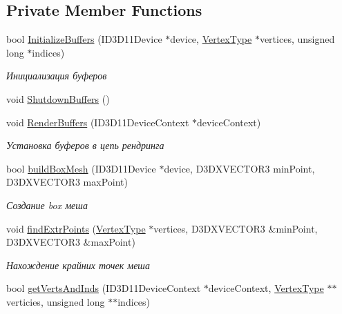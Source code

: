 \subsection*{Private Member Functions}
\begin{DoxyCompactItemize}
\item 
bool \hyperlink{class_mesh_class_a0a11d7bc06ff88f194b33229ce19ca62}{Initialize\+Buffers} (I\+D3\+D11\+Device $\ast$device, \hyperlink{struct_mesh_class_1_1_vertex_type}{Vertex\+Type} $\ast$vertices, unsigned long $\ast$indices)
\begin{DoxyCompactList}\small\item\em Инициализация буферов \end{DoxyCompactList}\item 
void \hyperlink{class_mesh_class_a6df03981f5d387453ea016abd6c185f4}{Shutdown\+Buffers} ()
\item 
void \hyperlink{class_mesh_class_a98e3d97acabf6b48d17152af2efb214c}{Render\+Buffers} (I\+D3\+D11\+Device\+Context $\ast$device\+Context)
\begin{DoxyCompactList}\small\item\em Установка буферов в цепь рендринга \end{DoxyCompactList}\item 
bool \hyperlink{class_mesh_class_a631e96de86a30d8773f46016d4bf0882}{build\+Box\+Mesh} (I\+D3\+D11\+Device $\ast$device, D3\+D\+X\+V\+E\+C\+T\+O\+R3 min\+Point, D3\+D\+X\+V\+E\+C\+T\+O\+R3 max\+Point)
\begin{DoxyCompactList}\small\item\em Создание box меша \end{DoxyCompactList}\item 
void \hyperlink{class_mesh_class_af0ed8e886d7c25ee730c067ad7ddbe4f}{find\+Extr\+Points} (\hyperlink{struct_mesh_class_1_1_vertex_type}{Vertex\+Type} $\ast$vertices, D3\+D\+X\+V\+E\+C\+T\+O\+R3 \&min\+Point, D3\+D\+X\+V\+E\+C\+T\+O\+R3 \&max\+Point)
\begin{DoxyCompactList}\small\item\em Нахождение крайних точек меша \end{DoxyCompactList}\item 
bool \hyperlink{class_mesh_class_aebf62f68c2b2420cfe1ff42d9201fb87}{get\+Verts\+And\+Inds} (I\+D3\+D11\+Device\+Context $\ast$device\+Context, \hyperlink{struct_mesh_class_1_1_vertex_type}{Vertex\+Type} $\ast$$\ast$verticies, unsigned long $\ast$$\ast$indices)
\end{DoxyCompactItemize}
